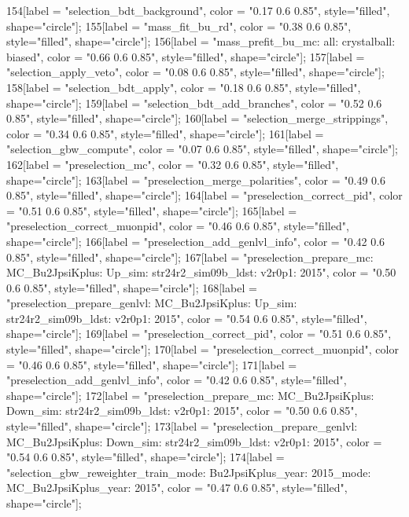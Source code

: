 {	154[label = "selection_bdt_background", color = "0.17 0.6 0.85", style="filled", shape="circle"];
	155[label = "mass_fit_bu_rd", color = "0.38 0.6 0.85", style="filled", shape="circle"];
	156[label = "mass_prefit_bu_mc\nmassbin: all\nmassmodel: crystalball\ntrigger: biased", color = "0.66 0.6 0.85", style="filled", shape="circle"];
	157[label = "selection_apply_veto", color = "0.08 0.6 0.85", style="filled", shape="circle"];
	158[label = "selection_bdt_apply", color = "0.18 0.6 0.85", style="filled", shape="circle"];
	159[label = "selection_bdt_add_branches", color = "0.52 0.6 0.85", style="filled", shape="circle"];
	160[label = "selection_merge_strippings", color = "0.34 0.6 0.85", style="filled", shape="circle"];
	161[label = "selection_gbw_compute", color = "0.07 0.6 0.85", style="filled", shape="circle"];
	162[label = "preselection_mc", color = "0.32 0.6 0.85", style="filled", shape="circle"];
	163[label = "preselection_merge_polarities", color = "0.49 0.6 0.85", style="filled", shape="circle"];
	164[label = "preselection_correct_pid", color = "0.51 0.6 0.85", style="filled", shape="circle"];
	165[label = "preselection_correct_muonpid", color = "0.46 0.6 0.85", style="filled", shape="circle"];
	166[label = "preselection_add_genlvl_info", color = "0.42 0.6 0.85", style="filled", shape="circle"];
	167[label = "preselection_prepare_mc\nmode: MC_Bu2JpsiKplus\npolarity: Up\nstrip_sim: str24r2_sim09b_ldst\nversion: v2r0p1\nyear: 2015", color = "0.50 0.6 0.85", style="filled", shape="circle"];
	168[label = "preselection_prepare_genlvl\nmode: MC_Bu2JpsiKplus\npolarity: Up\nstrip_sim: str24r2_sim09b_ldst\nversion: v2r0p1\nyear: 2015", color = "0.54 0.6 0.85", style="filled", shape="circle"];
	169[label = "preselection_correct_pid", color = "0.51 0.6 0.85", style="filled", shape="circle"];
	170[label = "preselection_correct_muonpid", color = "0.46 0.6 0.85", style="filled", shape="circle"];
	171[label = "preselection_add_genlvl_info", color = "0.42 0.6 0.85", style="filled", shape="circle"];
	172[label = "preselection_prepare_mc\nmode: MC_Bu2JpsiKplus\npolarity: Down\nstrip_sim: str24r2_sim09b_ldst\nversion: v2r0p1\nyear: 2015", color = "0.50 0.6 0.85", style="filled", shape="circle"];
	173[label = "preselection_prepare_genlvl\nmode: MC_Bu2JpsiKplus\npolarity: Down\nstrip_sim: str24r2_sim09b_ldst\nversion: v2r0p1\nyear: 2015", color = "0.54 0.6 0.85", style="filled", shape="circle"];
	174[label = "selection_gbw_reweighter_train\ndata_mode: Bu2JpsiKplus\ndata_year: 2015\nmc_mode: MC_Bu2JpsiKplus\nmc_year: 2015", color = "0.47 0.6 0.85", style="filled", shape="circle"];
}
